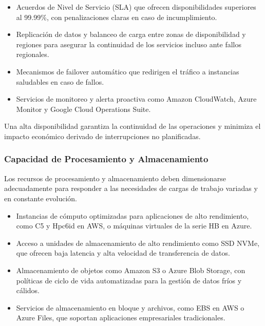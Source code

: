 {                \begin{itemize}
                    \item Acuerdos de Nivel de Servicio (SLA) que ofrecen disponibilidades superiores al 99.99\%, con penalizaciones claras en caso de incumplimiento.
                    \item Replicación de datos y balanceo de carga entre zonas de disponibilidad y regiones para asegurar la continuidad de los servicios incluso ante fallos regionales.
                    \item Mecanismos de failover automático que redirigen el tráfico a instancias saludables en caso de fallos.
                    \item Servicios de monitoreo y alerta proactiva como Amazon CloudWatch, Azure Monitor y Google Cloud Operations Suite.
                \end{itemize}
                
                Una alta disponibilidad garantiza la continuidad de las operaciones y minimiza el impacto económico derivado de interrupciones no planificadas.
                
            \subsubsection{Capacidad de Procesamiento y Almacenamiento}
                Los recursos de procesamiento y almacenamiento deben dimensionarse adecuadamente para responder a las necesidades de cargas de trabajo variadas y en constante evolución.
                
                \begin{itemize}
                    \item Instancias de cómputo optimizadas para aplicaciones de alto rendimiento, como C5 y Hpc6id en AWS, o máquinas virtuales de la serie HB en Azure.
                    \item Acceso a unidades de almacenamiento de alto rendimiento como SSD NVMe, que ofrecen baja latencia y alta velocidad de transferencia de datos.
                    \item Almacenamiento de objetos como Amazon S3 o Azure Blob Storage, con políticas de ciclo de vida automatizadas para la gestión de datos fríos y cálidos.
                    \item Servicios de almacenamiento en bloque y archivos, como EBS en AWS o Azure Files, que soportan aplicaciones empresariales tradicionales.
                \end{itemize}
                
}

